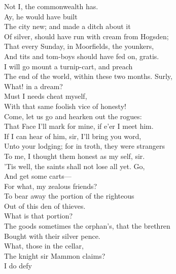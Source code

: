 \documentclass[a4paper,oneside]{memoir}
\begin{document}
\begin{drama*}
\mammonspeaks Not I, the commonwealth has.\\
\facespeaks {} Ay, he would have built\\
The city new; and made a ditch about it\\
Of silver, should have run with cream from Hogsden;\\
That every Sunday, in Moorfields, the younkers,\\
And tits and tom-boys should have fed on, gratis.\\
\mammonspeaks I will go mount a turnip-cart, and preach\\
The end of the world, within these two months. Surly,\\
What! in a dream?\\
\surlyspeaks {} Must I needs cheat myself,\\
With that same foolish vice of honesty!\\
Come, let us go and hearken out the rogues:\\
That Face I'll mark for mine, if e'er I meet him.\\
\facespeaks If I can hear of him, sir, I'll bring you word,\\
Unto your lodging; for in troth, they were strangers\\
To me, I thought them honest as my self, sir.\\
\tribulationspeaks 'Tis well, the saints shall not lose all yet. Go,\\
And get some carts---\\
\lovewitspeaks {} For what, my zealous friends?\\
\ananiasspeaks To bear away the portion of the righteous\\
Out of this den of thieves.\\
\lovewitspeaks {} What is that portion?\\
\ananiasspeaks The goods sometimes the orphan's, that the brethren\\
Bought with their silver pence.\\
\lovewitspeaks {} What, those in the cellar,\\
The knight sir Mammon claims?\\
\ananiasspeaks {} I do defy\\

\end{drama*}
\end{document}
